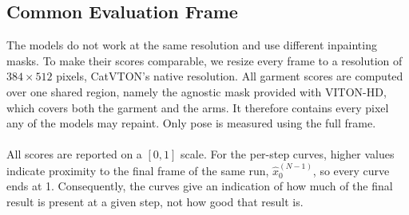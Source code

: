 \subsection{Common Evaluation Frame}
The models do not work at the same resolution and use different inpainting masks. To make their scores comparable, we resize every frame to a resolution of $384 \times 512$ pixels, CatVTON's native resolution. All garment scores are computed over one shared region, namely the agnostic mask provided with VITON-HD, which covers both the garment and the arms. It therefore contains every pixel any of the models may repaint. Only pose is measured using the full frame.
\\ \\ 
All scores are reported on a $[0,1]$ scale. For the per-step curves, higher values indicate proximity to the final frame of the same run, $\hat{x}_0^{(N-1)}$, so every curve ends at 1. Consequently, the curves give an indication of how much of the final result is present at a given step, not how good that result is.

